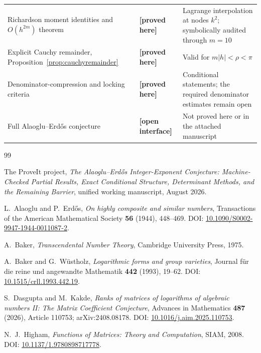 \documentclass[11pt,oneside]{article}
\theoremstyle{definition}
\theoremstyle{remark}
\newcommand{\AEname}{Alaoglu--Erd\H{o}s}
\newcommand{\paperproof}{\textcolor{proofgreen}{\textbf{[proved here]}}}
\newcommand{\openstatus}{\textcolor{openviolet}{\textbf{[open interface]}}}
\begin{document}
\begin{longtable}{>{\raggedright\arraybackslash}p{}
                  >{\raggedright\arraybackslash}p{}
                  >{\raggedright\arraybackslash}p{}}
\addlinespace
Richardson moment identities and $O(h^{2m})$ theorem & \paperproof{} & Lagrange interpolation
at nodes $k^2$; symbolically audited through $m=10$\\
\addlinespace
Explicit Cauchy remainder, Proposition~\ref{prop:cauchyremainder} & \paperproof{} & Valid for
$m|h|<\rho<\pi$\\
\addlinespace
Denominator-compression and locking criteria & \paperproof{} & Conditional statements; the
required denominator estimates remain open\\
\addlinespace
Full \AEname{} conjecture & \openstatus{} & Not proved here or in the attached manuscript\\
\bottomrule
\end{longtable}

\begin{thebibliography}{99}

The ProveIt project,
\newblock \emph{The Alaoglu--Erd\H{o}s Integer-Exponent Conjecture: Machine-Checked Partial
Results, Exact Conditional Structure, Determinant Methods, and the Remaining Barrier},
\newblock unified working manuscript, August 2026.

L.~Alaoglu and P.~Erd\H{o}s,
\newblock \emph{On highly composite and similar numbers},
\newblock Transactions of the American Mathematical Society \textbf{56} (1944), 448--469.
\newblock DOI:
\href{https://doi.org/10.1090/S0002-9947-1944-0011087-2}{10.1090/S0002-9947-1944-0011087-2}.

A.~Baker,
\newblock \emph{Transcendental Number Theory},
\newblock Cambridge University Press, 1975.

A.~Baker and G.~W\"ustholz,
\newblock \emph{Logarithmic forms and group varieties},
\newblock Journal f\"ur die reine und angewandte Mathematik \textbf{442} (1993), 19--62.
\newblock DOI:
\href{https://doi.org/10.1515/crll.1993.442.19}{10.1515/crll.1993.442.19}.

S.~Dasgupta and M.~Kakde,
\newblock \emph{Ranks of matrices of logarithms of algebraic numbers II: The Matrix
Coefficient Conjecture},
\newblock Advances in Mathematics \textbf{487} (2026), Article 110753;
arXiv:2408.08178.
\newblock DOI:
\href{https://doi.org/10.1016/j.aim.2025.110753}{10.1016/j.aim.2025.110753}.

N.~J.~Higham,
\newblock \emph{Functions of Matrices: Theory and Computation},
\newblock SIAM, 2008.
\newblock DOI: \href{https://doi.org/10.1137/1.9780898717778}{10.1137/1.9780898717778}.


\end{thebibliography}
\end{document}
